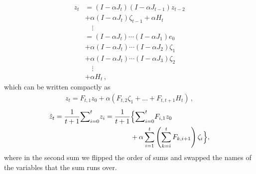 \begin{align*}
z_t
& = (I-\alpha J_t) (I-\alpha J_{t-1}) z_{t-2}\\ &+ \alpha (I-\alpha J_t) \zeta_{t-1} +\alpha H_t \\
& \quad \vdots\\
& = (I-\alpha J_t) \cdots (I-\alpha J_1) e_0\\ &+ \alpha (I-\alpha J_t) \cdots (I-\alpha J_2) \zeta_1 \\
& + \alpha (I-\alpha J_t) \cdots (I-\alpha J_3) \zeta_2\\
&  \quad \vdots \\
&+ \alpha H_t\,,
\end{align*}
which can be written compactly as
\begin{align}
\label{eq:etft}
z_t = F_{t,1} z_0 + \alpha (F_{t,2} \zeta_1 + \dots + F_{t,t+1} H_t )\,,
\end{align}
\begin{align*}
\hat{z}_t=\frac{1}{t+1}{\sum}_{i=0}^{t}z_i
=\frac{1}{t+1}&\Big\{{\sum}_{i=0}^{t} F_{i,1} z_0 \\
&+ \alpha \sum_{i=1}^{t} \left(\sum_{k=i}^{t} F_{k,i+1} \right)\zeta_i \Big\} ,
\end{align*}
where in the second sum we flipped the order of sums and swapped the names of the variables that the sum runs over.

